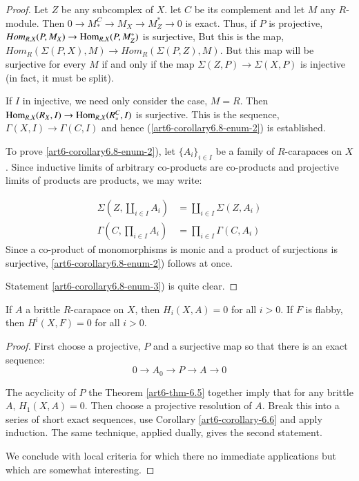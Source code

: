 \begin{proof}
Let $Z$ be any subcomplex of $X$. let $C$ be its complement and let $M$ any $R$-module. Then $0 \rightarrow M_{*}^{C} \rightarrow M_{X} \rightarrow M_{Z}^{*} \rightarrow 0$ is exact. Thus, if $P$ is projective, $Hom_{R,X}(P, M_{X}) \rightarrow \operatorname{Hom}_{R, X}(P, M_{Z}^{*})$ is surjective, But this is the map, $Hom_{R}(\Sigma(P, X), M) \rightarrow Hom_{R}(\Sigma(P, Z), M)$. But this map will be surjective for every $M$ if and only if the map $\Sigma(Z, P) \rightarrow \Sigma(X, P)$ is injective (in fact, it must be split).

If $I$ in injective, we need only consider the case, $M =R$. Then $\operatorname{Hom}_{R, X}(R_{X}, I) \rightarrow \operatorname{Hom}_{R, X}(R_{*}^{C}, I)$ is surjective. This is the sequence,  $\Gamma (X, I) \rightarrow \Gamma(C, I)$ and hence
(\ref{art6-corollary6.8-enum-2}) is established.

To prove \ref{art6-corollary6.8-enum-2}), let $\{A_{i}\}_{i \in I}$ be a family of $R$-carapaces on $X$. Since inductive limits of arbitrary co-products are co-products and projective limits of products are products, we may write:

\begin{equation}
\begin{aligned}\label{art6-eq-6.9}
\Sigma \left(Z, \coprod_{i \in I} A_{i}\right) &= \coprod_{i \in I} \Sigma (Z, A_{i})\\
\Gamma \left(C, \prod_{i \in I}A_{i}\right) &= \prod_{i \in I}\Gamma (C, A_{i})
\end{aligned}
\end{equation}
Since a co-product of monomorphisms is monic and a product of surjections is surjective, \ref{art6-corollary6.8-enum-2}) follows at once.

Statement \ref{art6-corollary6.8-enum-3}) is quite clear.
\end{proof}


\begin{prop}\label{art6-proposition-6.10}
If $A$ a brittle $R$-carapace on $X$, then $H_{i}(X, A) = 0$ for all $i > 0$. If $F$ is flabby, then $H^{i}(X, F) = 0$ for all $i > 0$.
\end{prop}

\begin{proof}
First choose a projective, $P$ and a surjective map so that there is an exact sequence:
$$
0 \rightarrow A_{0} \rightarrow P \rightarrow A \rightarrow 0
$$

The acyclicity of $P$ the Theorem \ref{art6-thm-6.5} together imply that for any brittle $A$, $H_{1}(X, A) = 0$. Then choose a projective resolution of $A$. Break this into a series of short exact sequences, use Corollary
\ref{art6-corollary-6.6} and apply induction. The same technique, applied dually, gives the second statement.

We conclude with local criteria for which there no immediate applications but which are somewhat interesting.
\end{proof}

